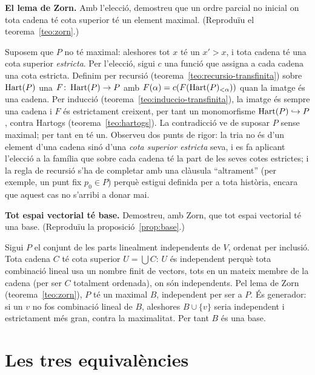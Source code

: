 \begin{exercici}
\textbf{El lema de Zorn.} Amb l'elecció, demostreu que un ordre parcial no inicial on tota cadena té cota superior té un element maximal. (Reproduïu el teorema~\ref{teo:zorn}.)
\end{exercici}
\begin{solucio}
Suposem que \(P\) no té maximal: aleshores tot \(x\) té un \(x'>x\), i tota cadena té una cota superior \emph{estricta}. Per l'elecció, sigui \(c\) una funció que assigna a cada cadena una cota estricta. Definim per recursió (teorema~\ref{teo:recursio-transfinita}) sobre \(\operatorname{Hart}(P)\) una \(F\colon\operatorname{Hart}(P)\to P\) amb \(F(\alpha)=c(F(\operatorname{Hart}(P)_{<\alpha}))\) quan la imatge és una cadena. Per inducció (teorema~\ref{teo:induccio-transfinita}), la imatge és sempre una cadena i \(F\) és estrictament creixent, per tant un monomorfisme \(\operatorname{Hart}(P)\hookrightarrow P\), contra Hartogs (teorema~\ref{teo:hartogs}). La contradicció ve de suposar \(P\) sense maximal; per tant en té un.
 Observeu dos punts de rigor: la tria no és d'un element d'una cadena sinó d'una \emph{cota superior estricta} seva, i es fa aplicant l'elecció a la família que sobre cada cadena té la part de les seves cotes estrictes; i la regla de recursió s'ha de completar amb una clàusula \enquote{altrament} (per exemple, un punt fix \(p_0\in P\)) perquè estigui definida per a tota història, encara que aquest cas no s'arribi a donar mai.
\end{solucio}

\begin{exercici}
\textbf{Tot espai vectorial té base.} Demostreu, amb Zorn, que tot espai vectorial té una base. (Reproduïu la proposició~\ref{prop:base}.)
\end{exercici}
\begin{solucio}
Sigui \(P\) el conjunt de les parts linealment independents de \(V\), ordenat per inclusió. Tota cadena \(C\) té cota superior \(U=\bigcup C\): \(U\) és independent perquè tota combinació lineal usa un nombre finit de vectors, tots en un mateix membre de la cadena (per ser \(C\) totalment ordenada), on són independents. Pel lema de Zorn (teorema~\ref{teo:zorn}), \(P\) té un maximal \(B\), independent per ser a \(P\). És generador: si un \(v\) no fos combinació lineal de \(B\), aleshores \(B\cup\{v\}\) seria independent i estrictament més gran, contra la maximalitat. Per tant \(B\) és una base.
\end{solucio}

\section{Les tres equivalències}\label{prac:equivalencies}

